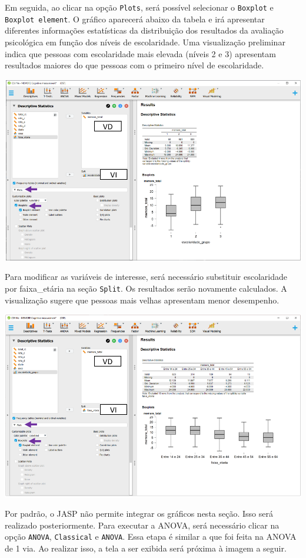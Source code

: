 \documentclass[
]{book}
\begin{document}
Em seguida, ao clicar na opção \texttt{Plots}, será possível selecionar o \texttt{Boxplot} e \texttt{Boxplot\ element}. O gráfico aparecerá abaixo da tabela e irá apresentar diferentes informações estatísticas da distribuição dos resultados da avaliação psicológica em função dos níveis de escolaridade. Uma visualização preliminar indica que pessoas com escolaridade mais elevada (níveis 2 e 3) apresentam resultados maiores do que pessoas com o primeiro nível de escolaridade.

\includegraphics{./img/cap_anova_two_way_plot.png}

Para modificar as variáveis de interesse, será necessário substituir escolaridade por faixa\_etária na seção \texttt{Split}. Os resultados serão novamente calculados. A visualização sugere que pessoas mais velhas apresentam menor desempenho.

\includegraphics{./img/cap_anova_two_way_plot1.png}

Por padrão, o JASP não permite integrar os gráficos nesta seção. Isso será realizado posteriormente. Para executar a ANOVA, será necessário clicar na opção \texttt{ANOVA}, \texttt{Classical} e \texttt{ANOVA}. Essa etapa é similar a que foi feita na ANOVA de 1 via. Ao realizar isso, a tela a ser exibida será próxima à imagem a seguir.
\end{document}
